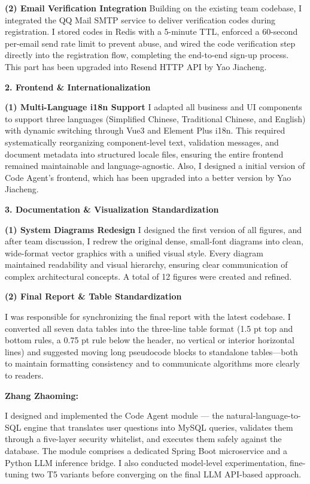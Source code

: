 \textbf{(2) Email Verification Integration}
Building on the existing team codebase, I integrated the QQ Mail SMTP service to deliver verification codes during registration. I stored codes in Redis with a 5-minute TTL, enforced a 60-second per-email send rate limit to prevent abuse, and wired the code verification step directly into the registration flow, completing the end-to-end sign-up process. This part has been upgraded into Resend HTTP API by Yao Jiacheng.

\textbf{2. Frontend \& Internationalization}

\textbf{(1) Multi-Language i18n Support}
I adapted all business and UI components to support three languages (Simplified Chinese, Traditional Chinese, and English) with dynamic switching through Vue3 and Element Plus i18n. This required systematically reorganizing component-level text, validation messages, and document metadata into structured locale files, ensuring the entire frontend remained maintainable and language-agnostic. Also, I designed a initial version of Code Agent's frontend, which has been upgraded into a better version by Yao Jiacheng.

\textbf{3. Documentation \& Visualization Standardization}

\textbf{(1) System Diagrams Redesign}
I designed the first version of all figures, and after team discussion, I redrew the original dense, small-font diagrams into clean, wide-format vector graphics with a unified visual style. Every diagram maintained readability and visual hierarchy, ensuring clear communication of complex architectural concepts. A total of 12 figures were created and refined.

\textbf{(2) Final Report \& Table Standardization}

I was responsible for synchronizing the final report with the latest codebase. I converted all seven data tables into the three-line table format (1.5 pt top and bottom rules, a 0.75 pt rule below the header, no vertical or interior horizontal lines) and suggested moving long pseudocode blocks to standalone tables—both to maintain formatting consistency and to communicate algorithms more clearly to readers.

\vspace{4mm}

\noindent\textbf{Zhang Zhaoming:}

\vspace{2mm}

I designed and implemented the Code Agent module — the natural-language-to-SQL engine that translates user questions into MySQL queries, validates them through a five-layer security whitelist, and executes them safely against the database. The module comprises a dedicated Spring Boot microservice and a Python LLM inference bridge. I also conducted model-level experimentation, fine-tuning two T5 variants before converging on the final LLM API-based approach.

